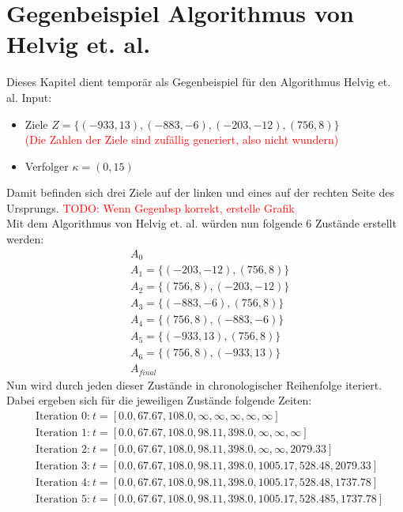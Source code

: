 \documentclass{scrartcl}
\begin{document}
\section{Gegenbeispiel Algorithmus von Helvig et. al.}

Dieses Kapitel dient temporär als Gegenbeispiel für den Algorithmus Helvig et. al. 
Input: 
\begin{itemize}
\item
Ziele $Z=\{(-933,13),(-883,-6),(-203,-12),(756,8)\}$\\
\textcolor{red}{(Die Zahlen der Ziele sind zufällig generiert, also nicht wundern)}
\item
Verfolger $\kappa=(0,15)$
\end{itemize}
Damit befinden sich drei Ziele auf der linken und eines auf der rechten Seite des Ursprungs.
\textcolor{red}{TODO: Wenn Gegenbsp korrekt, erstelle Grafik}\\
Mit dem Algorithmus von Helvig et. al. würden nun folgende 6 Zustände erstellt werden:
\begin{align*}
&A_0 \\
&A_1 = \{(-203, -12), (756, 8)\}\\
&A_2 = \{(756, 8), (-203, -12)\}\\
&A_3 = \{(-883, -6), (756, 8)\}\\
&A_4 = \{(756, 8), (-883, -6)\}\\
&A_5 = \{(-933, 13), (756, 8)\}\\
&A_6 = \{(756, 8), (-933, 13)\}\\
&A_{final} 
\end{align*}
Nun wird durch jeden dieser Zustände in chronologischer Reihenfolge iteriert. Dabei ergeben sich für die jeweiligen Zustände folgende Zeiten:
\begin{align*}
&\text{Iteration 0:}~t=[0.0, 67.67, 108.0, \infty, \infty, \infty, \infty, \infty] \\
&\text{Iteration 1:}~t=[0.0, 67.67, 108.0, 98.11, 398.0, \infty, \infty, \infty] \\
&\text{Iteration 2:}~t=[0.0, 67.67, 108.0, 98.11, 398.0, \infty, \infty, 2079.33] \\
&\text{Iteration 3:}~t=[0.0, 67.67, 108.0, 98.11, 398.0, 1005.17, 528.48, 2079.33] \\
&\text{Iteration 4:}~t=[0.0, 67.67, 108.0, 98.11, 398.0, 1005.17, 528.48, 1737.78] \\
&\text{Iteration 5:}~t=[0.0, 67.67, 108.0, 98.11, 398.0, 1005.17, 528.485, 1737.78]
\end{align*}
\end{document}
